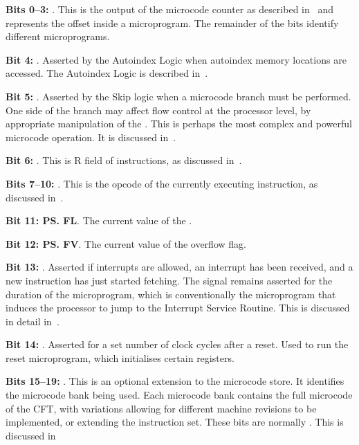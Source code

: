 \begin{description}
\item \textbf{Bits 0–3: \UPC}. This is the output of the microcode counter as
  described in~ and represents the offset inside a
  microprogram. The remainder of the bits identify different microprograms.
\item \textbf{Bit 4: }. Asserted by the Autoindex Logic when autoindex memory locations are accessed. The Autoindex Logic is described in~.
\item \textbf{Bit 5: }. Asserted by the Skip logic when a microcode
  branch must be performed. One side of the branch may affect flow control at
  the processor level, by appropriate manipulation of the \PC. This is perhaps the most complex and powerful microcode operation. It is discussed in~.
\item \textbf{Bit 6: }. This is R field of instructions, as discussed
  in~.
\item \textbf{Bits 7–10: }. This is the opcode of the currently
  executing instruction, as discussed in~.
\item \textbf{Bit 11: \ps{FL}}. The current value of the \Lreg.
\item \textbf{Bit 12: \ps{FV}}. The current value of the overflow flag.
\item \textbf{Bit 13: }. Asserted if interrupts are allowed, an
  interrupt has been received, and a new instruction has just started
  fetching. The signal remains asserted for the duration of the microprogram,
  which is conventionally the microprogram that induces the processor to jump
  to the \gls{Interrupt Service Routine}. This is discussed in detail
  in~.
\item \textbf{Bit 14: }. Asserted for a set number of clock cycles after a reset. Used to run the reset microprogram, which initialises certain registers.
\item \textbf{Bits 15–19: \UCB}. This is an optional extension to the microcode
  store. It identifies the microcode bank being used. Each microcode bank
  contains the full microcode of the CFT, with variations allowing for
  different machine revisions to be implemented, or extending the instruction
  set. These bits are normally . This is discussed in~
\end{description}
